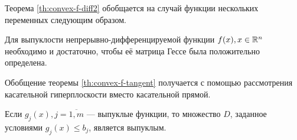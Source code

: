 Теорема \ref{th:convex-f-diff2} обобщается на случай функции
нескольких переменных следующим образом.
\begin{thm}
  \label{th:convex-f-hess}
  Для выпуклости непрерывно-дифференцируемой функции $f(x), x \in
  \mathbb{R}^n$ необходимо и достаточно, чтобы её матрица Гессе была
  положительно определена.
\end{thm}

Обобщение теоремы \ref{th:convex-f-tangent} получается с помощью
рассмотрения касательной гиперплоскости вместо касательной прямой.

\begin{thm}
  \label{th:convex-set}
  Если $g_j(x), j=\overline{1,m}$ — выпуклые функции, то множество
  $D$, заданное условиями $g_j(x) \leq b_j$, является выпуклым.
\end{thm}
